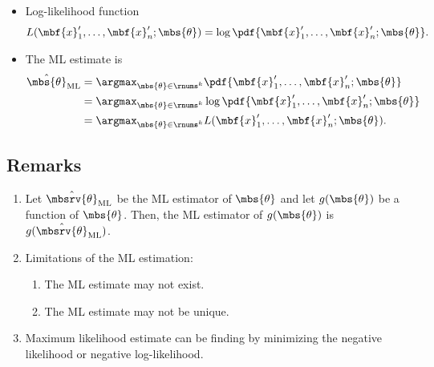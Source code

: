 \begin{myremark}
    \begin{itemize}
        \item Log-likelihood function 
        \begin{align}
            L(\mbf{x}_{1}',\ldots,\mbf{x}_{n}';\mbs{\theta}) = \log \pdf{\mbf{x}_{1}',\ldots, \mbf{x}_{n}';\mbs{\theta}}.
        \end{align}
        \item The ML estimate is 
        \begin{align}
            \hat{\mbs{\theta}}_{\mathrm{ML}} 
            &= \argmax_{\mbs{\theta}\in\rnums^{k}} \pdf{\mbf{x}_{1}',\ldots, \mbf{x}_{n}';\mbs{\theta}}\\
            &= \argmax_{\mbs{\theta}\in\rnums^{k}} \log \pdf{\mbf{x}_{1}',\ldots, \mbf{x}_{n}';\mbs{\theta}}\\
            &= \argmax_{\mbs{\theta}\in\rnums^{k}} L(\mbf{x}_{1}',\ldots,\mbf{x}_{n}';\mbs{\theta}).
        \end{align}
    \end{itemize}
\end{myremark}

\subsection{Remarks}
\begin{enumerate}
    \item Let $\hat{\mbsrv{\theta}}_{\mathrm{ML}}$ be the ML estimator of $\mbs{\theta}$ and let $g(\mbs{\theta})$ be a function of $\mbs{\theta}$. Then, the ML estimator of $g(\mbs{\theta})$ is $g(\hat{\mbsrv{\theta}}_{\mathrm{ML}})$.
    
    \item Limitations of the ML estimation:
    \begin{enumerate}
        \item The ML estimate may not exist.
        \item The ML estimate may not be unique. 
    \end{enumerate}        
    
    \item Maximum likelihood estimate can be finding by minimizing the negative likelihood or negative log-likelihood.
\end{enumerate}

